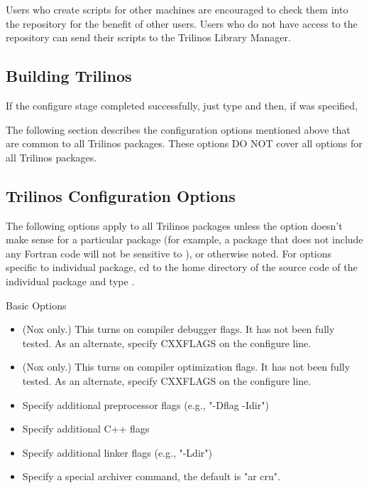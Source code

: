 \documentclass[12pt,relax]{TrilinosDevGuide}
\begin{document}
\begin{enumerate}
Users who create scripts for other machines are encouraged to check them into 
the repository for the benefit of other users.  Users who do not have access to
the repository can send their scripts to the Trilinos Library Manager.
\end{enumerate}

\subsection{Building Trilinos}

If the configure stage completed successfully, just type 
 and then, if 
 was specified, 

The following section describes the configuration options mentioned above that 
are common to all Trilinos packages.  These options DO NOT cover all options 
for all Trilinos packages.

\subsection{Trilinos Configuration Options}
\label{subsect:TrilinosConfigOptions}
The following options apply to all Trilinos packages unless 
the option doesn't make sense for a particular package (for example, a 
package that does not include any Fortran code will not be sensitive to 
), or otherwise noted.  For options specific to 
individual package, cd to the home directory of the source code of the 
individual package and type .

Basic Options

\begin{itemize}
\item {} 

(Nox only.)  This turns on compiler debugger flags. It has 
not been fully tested. As an alternate, specify CXXFLAGS on the 
                 configure line.

\item {}

(Nox only.)  This turns on compiler optimization flags. It 
has not been fully tested. As an alternate, specify CXXFLAGS on the 
                 configure line. 

\item {}

Specify additional preprocessor flags (e.g., "-Dflag -Idir") 

\item {}

Specify additional C++ flags 

\item {}

Specify additional linker flags (e.g., "-Ldir") 

\item {}

Specify a special archiver command, the default is "ar cru". 
\end{itemize}
\end{document}
